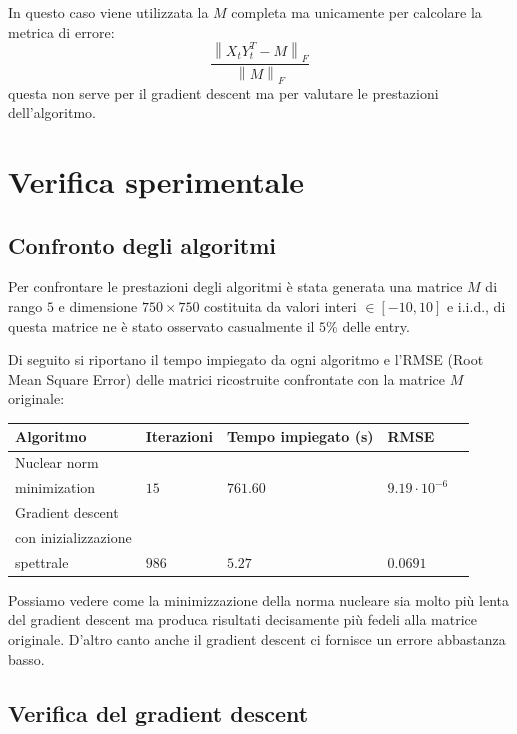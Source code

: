 \documentclass[12pt,a4paper]{report}
\newcommand{\frobnorm}[1]{\left\lVert#1\right\rVert _F}
\begin{document}
\newpage

In questo caso viene utilizzata la $M$ completa ma unicamente per
calcolare la metrica di errore:
$$\frac{\frobnorm{X_t Y_t^T - M}}{\frobnorm{M}}$$
questa non serve per il gradient descent
ma per valutare le prestazioni dell'algoritmo.

\chapter{Verifica sperimentale}

\section{Confronto degli algoritmi}

Per confrontare le prestazioni degli algoritmi è stata generata una matrice
$M$ di rango $5$ e dimensione $750 \times 750$ costituita da valori
interi $\in [-10,10]$ e i.i.d., di questa matrice ne è stato
osservato casualmente il $5\%$ delle entry.

Di seguito si riportano il tempo impiegato
da ogni algoritmo e l'RMSE (Root Mean Square Error)
delle matrici ricostruite confrontate con la matrice $M$ originale:

\begin{table}[H]
  \centering
  \begin{tabular}{@{}lllll@{}}
  \toprule
  \textbf{Algoritmo} & \textbf{Iterazioni} & \textbf{Tempo impiegato (s)} & \textbf{RMSE} \\ \midrule
  Nuclear norm\\ minimization                         & $15$  & $761.60$ & $9.19\cdot 10^{-6}$ \\ \midrule
  Gradient descent\\ con inizializzazione\\ spettrale & $986$ & $5.27$   & $0.0691$             \\ \bottomrule
  \end{tabular}
\end{table}
Possiamo vedere come la minimizzazione della norma nucleare
sia molto più lenta del gradient descent ma produca risultati decisamente più
fedeli alla matrice originale. D'altro canto anche il gradient descent ci 
fornisce un errore abbastanza basso.

\newpage

\section{Verifica del gradient descent}
\end{document}
